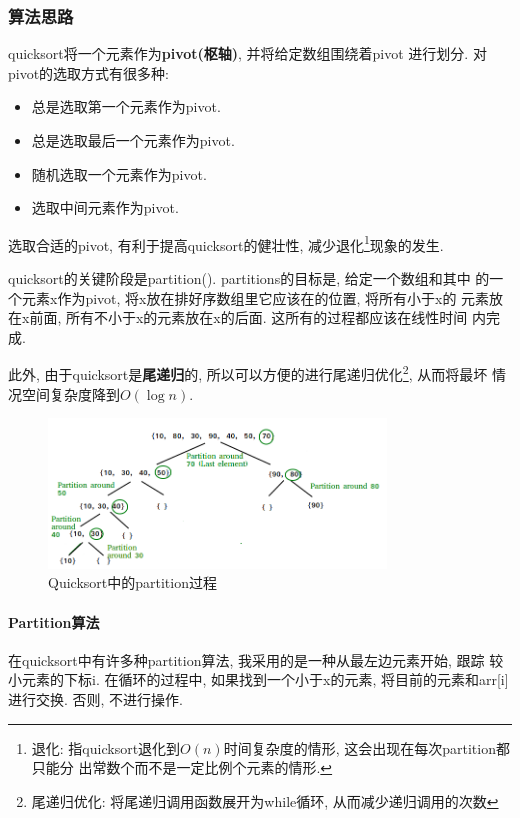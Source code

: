 \subsubsection{算法思路}
quicksort将一个元素作为\textbf{pivot(枢轴)}, 并将给定数组围绕着pivot
进行划分. 对pivot的选取方式有很多种:
\begin{itemize}
	\item 总是选取第一个元素作为pivot.
	\item 总是选取最后一个元素作为pivot.
	\item 随机选取一个元素作为pivot.
	\item 选取中间元素作为pivot.
\end{itemize}
选取合适的pivot, 有利于提高quicksort的健壮性, 减少退化\footnote{退化:
	指quicksort退化到$O(n)$时间复杂度的情形, 这会出现在每次partition都只能分
	出常数个而不是一定比例个元素的情形.}现象的发生.\par
quicksort的关键阶段是partition(). partitions的目标是, 给定一个数组和其中
的一个元素x作为pivot, 将x放在排好序数组里它应该在的位置, 将所有小于x的
元素放在x前面, 所有不小于x的元素放在x的后面. 这所有的过程都应该在线性时间
内完成. \par
此外, 由于quicksort是\textbf{尾递归}的, 所以可以方便的进行尾递归优化\footnote{
	尾递归优化: 将尾递归调用函数展开为while循环, 从而减少递归调用的次数}, 从而将最坏
情况空间复杂度降到$O(\log{n})$.
\begin{figure}[h!]
	\centering
	\includegraphics[width=0.8\textwidth]{figures/QuickSort2.png}
	\caption{Quicksort中的partition过程}
\end{figure}
\paragraph{Partition算法}
在quicksort中有许多种partition算法, 我采用的是一种从最左边元素开始, 跟踪
较小元素的下标i. 在循环的过程中, 如果找到一个小于x的元素,
将目前的元素和arr[i]进行交换. 否则, 不进行操作.

